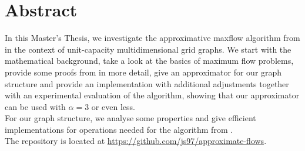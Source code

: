 %
% 
% 
%


\renewcommand{\Thema}{%
    An Experimental Evaluation of Heuristics for Approximate Maxflow Algorithms}

\usepackage{amssymb}
\usepackage{mathtools}
\usepackage{tikz}
\usepackage{subfigure}
\usepackage{pgfplots}
\usepackage{bbm}

\usepackage{algorithm}
\usepackage{algpseudocode}

\usepackage{pgf-umlcd}
\usepackage{seqsplit}






\tableofcontents %

\chapter{Abstract}
In this Master's Thesis, we investigate the approximative maxflow algorithm from \cite{nmfnlt} in the context of unit-capacity multidimensional grid graphs. We start with the mathematical background, take a look at the basics of maximum flow problems, provide some proofs from \cite{nmfnlt} in more detail, give an approximator for our graph structure and provide an implementation with additional adjustments together with an experimental evaluation of the algorithm, showing that our approximator can be used with $\alpha=3$ or even less.\\
For our graph structure, we analyse some properties and give efficient implementations for operations needed for the algorithm from \cite{nmfnlt}.\\
The repository is located at \url{https://github.com/js97/approximate-flows}.
